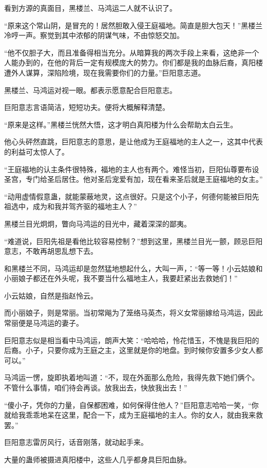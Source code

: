 \begin{this_body}
看到方源的真面目，黑楼兰、马鸿运二人就不认识了。

“原来这个常山阴，是冒充的！居然胆敢入侵王庭福地。简直是胆大包天！”黑楼兰冷哼一声。察觉到其中浓郁的阴谋气味，不由惊怒交加。

“他不仅胆子大，而且准备得相当充分。从暗算我的两次手段上来看，这绝非一个人能办到的，在他的背后一定有规模庞大的势力。你们都是我的血脉后裔，真阳楼遭外人谋算，深陷险境，现在我需要你们的力量。”巨阳意志道。

黑楼兰、马鸿运对视一眼。都表示愿意配合巨阳意志。

巨阳意志言语简洁，短短功夫。便将大概解释清楚。

“原来是这样。”黑楼兰恍然大悟，这才明白真阳楼为什么会帮助太白云生。

他心头砰然直跳，巨阳意志的意思，是让他成为王庭福地的主人之一，这其中代表的利益可太惊人了。

“王庭福地的认主条件很特殊，福地的主人也有两个。难怪当初，巨阳仙尊要布设圣宫，专门给圣后居住。他对圣后宠爱有加，现在看来圣后就是王庭福地的女主。”

“动用虚情假意蛊，就能蒙蔽地灵，这点很好。只是这个小子，何德何能被巨阳先祖选中，成为和我并驾齐驱的福地主人？”

黑楼兰目光炯炯，瞥向马鸿运的目光中，藏着深深的鄙夷。

“难道说，巨阳先祖是看他比较容易控制？”想到这里，黑楼兰目光一颤，顾忌巨阳意志，不敢再胡思乱想下去。

和黑楼兰不同，马鸿运却是忽然猛地想起什么，大叫一声，：“等一等！小云姑娘和小丽娘子都还在外头呢，我不要当什么福地主人，我要赶紧出去救她们！”

小云姑娘，自然是指赵怜云。

而小丽娘子，则是常丽。当初常飚为了笼络马英杰，将义女常丽嫁给马鸿运，因此常丽便是马鸿运的妻子。

巨阳意志似是相当看中马鸿运，朗声大笑：“哈哈哈，怜花惜玉，不愧是我巨阳的后裔。小子，只要你成为王庭之主，这里就是你的地盘。到时候你安置多少女人都可以。”

马鸿运一愣，旋即执着地叫道：“不，现在外面那么危险，我得先救下她们俩个。不管什么事情，咱们待会再谈。放我出去，快放我出去！”

“傻小子，凭你的力量，自保都困难，如何保得住他人？”巨阳意志哈哈一笑，“你就给我乖乖地呆在这里，配合一下，成为王庭福地的主人。你的女人，就由我来救罢。”

巨阳意志雷厉风行，话音刚落，就动起手来。

大量的蛊师被摄进真阳楼中，这些人几乎都身具巨阳血脉。


\end{this_body}
